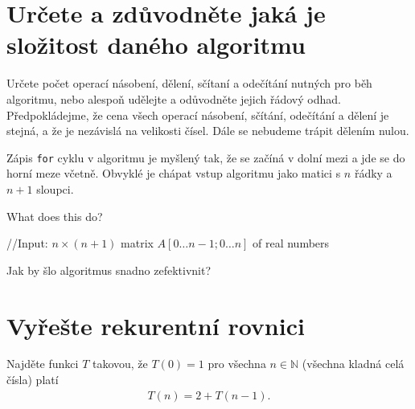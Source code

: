 \documentclass[12pt,oneside]{article}
\begin{document}
	\section{Určete a zdůvodněte jaká je složitost daného algoritmu}
	Určete počet operací násobení, dělení, sčítaní a odečítání nutných pro běh algoritmu, nebo alespoň udělejte a odůvodněte jejich řádový odhad.
	Předpokládejme, že cena všech operací násobení, sčítání, odečítání a dělení je stejná, a že je nezávislá na velikosti čísel.
	Dále se nebudeme trápit dělením nulou.
	
	Zápis \verb|for| cyklu v algoritmu je myšlený tak, že se začíná v dolní mezi a jde se do horní meze včetně.
	Obvyklé je chápat vstup algoritmu jako matici s $n$ řádky a $n+1$ sloupci.
	\begin{algorithm}[h]
		\caption{What does this do?}
		\DontPrintSemicolon
		//Input: $n\times (n+1)$ matrix $A[0\dots n-1; 0 \dots n]$ of real numbers \;
		\end{algorithm}
	
	Jak by šlo algoritmus snadno zefektivnit?
	
	\section{Vyřešte rekurentní rovnici}
	Najděte funkci $T$ takovou, že $T(0) = 1$ pro všechna $n \in \mathbb{N}$ (všechna kladná celá čísla) platí
	\begin{align}
		T(n) = 2 + T(n-1).
	\end{align}
\end{document}
